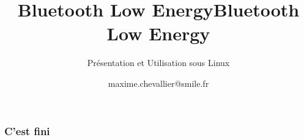 \documentclass{smilebeamer}
\title{Bluetooth Low Energy}
\author{maxime.chevallier@smile.fr}
\begin{document}
\begin{frame}[plain]
    \title{Bluetooth Low Energy}
    \subtitle{Présentation et Utilisation sous Linux}
    \titlepage
\end{frame}







\begin{frame}
	\frametitle{C'est fini}
\end{frame}
\end{document}
